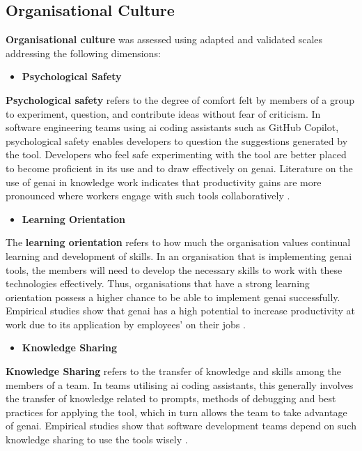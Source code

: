 \subsection{Organisational Culture}
\label{sec:Organisational Culture}
\textbf{Organisational culture} was assessed using adapted and validated scales addressing the following dimensions:

\begin{itemize}
	\item \textbf{Psychological Safety}
\end{itemize}
\textbf{Psychological safety} refers to the degree of comfort felt by members of a group to experiment, question, and contribute ideas without fear of criticism. In software engineering teams using \gls{ai} coding assistants such as GitHub Copilot, psychological safety enables developers to question the suggestions generated by the tool. Developers who feel safe experimenting with the tool are better placed to become proficient in its use and to draw effectively on \gls{genai}. Literature on the use of \gls{genai} in knowledge work indicates that productivity gains are more pronounced where workers engage with such tools collaboratively \autocite{Noy2023}.

\begin{itemize}
	\item \textbf{Learning Orientation}
\end{itemize}
The \textbf{learning orientation} refers to how much the organisation values continual learning and development of skills. In an organisation that is implementing \gls{genai} tools, the members will need to develop the necessary skills to work with these technologies effectively. Thus, organisations that have a strong learning orientation possess a higher chance to be able to implement \gls{genai} successfully. Empirical studies show that \gls{genai} has a high potential to increase productivity at work due to its application by employees' on their jobs \autocite{Brynjolfsson2025}.

\begin{itemize}
	\item \textbf{Knowledge Sharing}
\end{itemize}
\textbf{Knowledge Sharing} refers to the transfer of knowledge and skills among the members of a team. In teams utilising \gls{ai} coding assistants, this generally involves the transfer of knowledge related to prompts, methods of debugging and best practices for applying the tool, which in turn allows the team to take advantage of \gls{genai}. Empirical studies show that software development teams depend on such knowledge sharing to use the tools wisely \autocite{Sergeyuk2025}.

